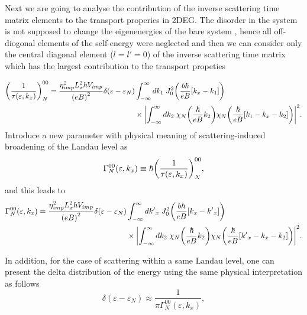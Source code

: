 Next we are going to analyse the contribution of the inverse scattering time matrix elements to the transport properies in 2DEG. The disorder in the system is not supposed to change the eigenenergies of the bare system \cite{wackerl20}, hence all off-diogonal elements of the self-energy were neglected and then we can consider only the central diagonal element (${l=l'=0}$) of the inverse scattering time matrix which has the largest contribution to the transport propeties
\begin{widetext}
  \begin{equation} \label{eq_14}
    \begin{aligned}
      \qty(\frac{1}{\tau(\varepsilon,k_x)})^{00}_{N} =
      \frac { \eta_{imp}^2 L_x^2 \hbar V_{imp}}{\qty(eB)^2}
      \delta(\varepsilon - \varepsilon_{N}) &
      \int_{-\infty}^{\infty} d k_1 \;
      J_0^2\qty(\frac{b\hbar}{eB}[{k}_x -  k_1])
      \\
      & \times
      \qty|
      \int_{-\infty}^{\infty} d k_2 \;
      {\chi}_{N}\qty(\frac{\hbar}{eB}k_2)
      {\chi}_{N}\qty(\frac{\hbar}{eB} \qty[k_1 - {k}_x - k_2])|^2.
    \end{aligned}
  \end{equation}
Introduce a new parameter with physical meaning of scattering-induced broadening of the Landau level as \cite{dini16,endo09}
\begin{equation} \label{eq_15}
 \Gamma^{00}_{N}(\varepsilon,k_x) \equiv \hbar \qty(\frac{1}{\tau(\varepsilon,k_x)})^{00}_{N},
\end{equation}
and this leads to
\begin{equation} \label{eq_16}
 \begin{aligned}
   \Gamma^{00}_{N}(\varepsilon,k_x)  =
   \frac { \eta_{imp}^2 L_x^2 \hbar V_{imp}}{\qty(eB)^2}
   \delta(\varepsilon - \varepsilon_{N}) &
   \int_{-\infty}^{\infty} d {k'}_x \;
   J_0^2\qty(\frac{b\hbar}{eB}[{k}_x - {k'}_x])
   \\
   & \times
   \qty|
   \int_{-\infty}^{\infty} dk_2 \;
   {\chi}_{N}\qty(\frac{\hbar}{eB}k_2)
   {\chi}_{N}\qty(\frac{\hbar}{eB} \qty[{k'}_x - {k}_x - k_2])|^2.
 \end{aligned}
\end{equation}
\end{widetext}
In addition, for the case of scattering within a same Landau level, one can present the delta distribution of the energy using the same physical interpretation \cite{dini16} as follows
\begin{equation} \label{eq_17}
 \delta(\varepsilon - \varepsilon_{N}) \approx
 \frac{1}{\pi \Gamma^{00}_{N}(\varepsilon,k_x)},
\end{equation}
